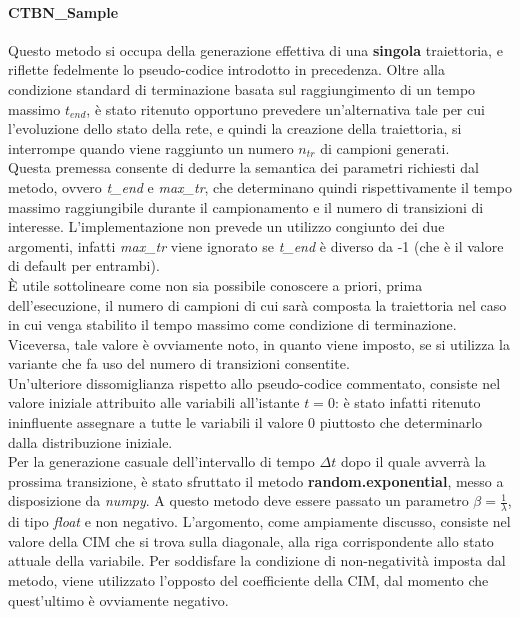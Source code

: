   \paragraph{CTBN\_Sample}
  Questo metodo si occupa della generazione effettiva di una \textbf{singola} traiettoria, e riflette
  fedelmente lo pseudo-codice introdotto in precedenza. Oltre alla condizione standard di terminazione
  basata sul raggiungimento di un tempo massimo $t_{end}$, è stato ritenuto opportuno prevedere
  un'alternativa tale per cui l'evoluzione dello stato della rete, e quindi la creazione della traiettoria,
  si interrompe quando viene raggiunto un numero $n_{tr}$ di campioni generati.\\
  Questa premessa consente di dedurre la semantica dei parametri richiesti dal metodo, ovvero \textit{t\_end}
  e \textit{max\_tr}, che determinano quindi rispettivamente il tempo massimo raggiungibile durante 
  il campionamento e il numero di transizioni di interesse. L'implementazione non prevede un utilizzo
  congiunto dei due argomenti, infatti \textit{max\_tr} viene ignorato se \textit{t\_end} è diverso da -1
  (che è il valore di default per entrambi).\\ 
  È utile sottolineare come non sia possibile conoscere a priori, prima dell'esecuzione, il numero
  di campioni di cui sarà composta la traiettoria nel caso in cui venga stabilito il tempo massimo
  come condizione di terminazione. Viceversa, tale valore è ovviamente noto, in quanto viene imposto, 
  se si utilizza la variante che fa uso del numero di transizioni consentite.\\
  Un'ulteriore dissomiglianza rispetto allo pseudo-codice commentato, consiste nel valore iniziale attribuito
  alle variabili all'istante $t = 0$: è stato infatti ritenuto ininfluente assegnare a tutte le variabili
  il valore 0 piuttosto che determinarlo dalla distribuzione iniziale.\\
  Per la generazione casuale dell'intervallo di tempo $\Delta t$ dopo il quale avverrà la prossima 
  transizione, è stato sfruttato il metodo \textbf{random.exponential}, messo a disposizione da \textit{numpy}.
  A questo metodo deve essere passato un parametro $\beta = \frac{1}{\lambda}$, di tipo \textit{float}
  e non negativo. L'argomento, come ampiamente discusso, consiste nel valore della CIM che si trova 
  sulla diagonale, alla riga corrispondente allo stato attuale della variabile. Per soddisfare la condizione di non-negatività 
  imposta dal metodo, viene utilizzato l'opposto del coefficiente della CIM, dal momento che quest'ultimo è ovviamente negativo.\\
